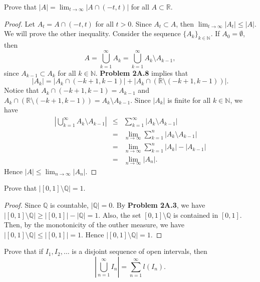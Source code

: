 \documentclass[14.5pt]{article}
\newcommand{\N}{\mathbb{N}}
\newcommand{\Q}{\mathbb{Q}}
\newcommand{\R}{\mathbb{R}}
\newenvironment{problem}[2][Problem]{\begin{mdframed}[backgroundcolor=gray!10, leftline = false, rightline=false, linewidth=0.25pt]  \begin{trivlist}
\item[\hskip \labelsep {\bfseries #1}\hskip \labelsep {\bfseries #2.}]}{\end{trivlist} \end{mdframed}  }
\begin{document}
\begin{problem}{2A.9}
Prove that $| A | = \lim_{t \to \infty} | A \cap (-t, t) |$ for all $A \subset \R.$
\end{problem}
\begin{proof}
    Let $A_t = A \cap (-t, t)$ for all $t > 0.$ Since $A_t \subset A$, then $\lim_{t \to \infty} | A_t | \leq | A|.$ We will prove the other inequality. Consider the sequence $\{A_k\}_{k\in \N}$. If $A_0 = \emptyset$, then
    $$A = \bigcup_{k=1}^\infty A_k = \bigcup_{k=1}^\infty A_k \setminus A_{k-1},$$
since $A_{k-1} \subset A_k$ for all $k\in \N.$ \textbf{Problem 2A.8} implies that
$$| A_k | = | A_k \cap (-k+1, k-1) | + | A_k \cap (\R \setminus (-k+1, k-1))|. $$
Notice that $A_k \cap (-k+1, k-1) = A_{k-1}$ and $A_k \cap (\R \setminus (-k+1, k-1)) = A_k \setminus A_{k-1}$. Since $| A_k |$ is finite for all $k \in \N$, we have
\begin{eqnarray*}
\left| \bigcup_{k=1}^\infty A_k \setminus A_{k-1} \right| &\leq & \sum_{k=1}^\infty | A_k \setminus A_{k-1} | \\
&=& \lim_{n \to \infty} \sum_{k=1}^n | A_k \setminus A_{k-1} |\\
&=& \lim_{n \to \infty} \sum_{k=1}^n | A_k | - | A_{k-1} | \\
&=& \lim_{n \to \infty} | A_n |.
\end{eqnarray*}
Hence $| A | \leq \lim_{n \to \infty} | A_n |.$
\end{proof}


\begin{problem}{2A.10} Prove that $| [0,1] \setminus \Q | = 1.$
\end{problem}
\begin{proof}
    Since $\Q$ is countable, $| \Q | = 0$. By \textbf{Problem 2A.3}, we have $| [0,1] \setminus \Q |\geq |[0,1]| - | \Q | = 1$. Also, the set $[0,1] \setminus \Q$ is contained in $[0,1]$. Then, by the monotonicity of the outher measure, we have $|[0,1] \setminus \Q | \leq | [0,1] | = 1.$ Hence $|[0,1] \setminus \Q | = 1$.
\end{proof}

\begin{problem}{2A.11} Prove that if $I_1, I_2, \ldots$ is a disjoint sequence of open intervals, then 
$$\left\lvert \bigcup_{n=1}^\infty I_n\right\rvert = \sum_{n=1}^\infty l(I_n).$$
\end{problem}
\end{document}
